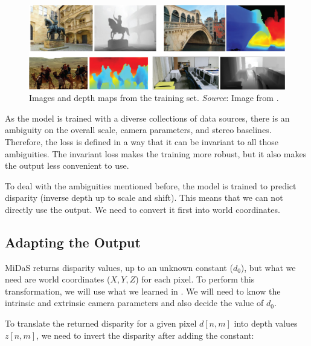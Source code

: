 \begin{figure}
\centerline{
\includegraphics[width=1\linewidth]{figures/simplesystem_revisited/examples_training_midas.jpg}
} 
\caption{Images and depth maps from the training set. {\em Source}: Image from \cite{Ranftl2022}.}
\label{fig:examples_training_midas}
\end{figure}

As the model is trained with a diverse collections of data sources, there is an ambiguity on the overall scale, camera parameters, and stereo baselines. Therefore, the loss is defined in a way that it can be invariant to all those ambiguities. The invariant loss makes the training more robust, but it also makes the output less convenient to use. 

To deal with the ambiguities mentioned before, the model is trained to predict disparity (inverse depth up to scale and shift). This means that we can not directly use the output. We need to convert it first into world coordinates. 

\subsection{Adapting the Output}\label{sec:simple_system_revisited:adapting_the_output}


MiDaS returns disparity values, up to an unknown constant ($d_0$), but what we need are world coordinates ($X,Y,Z$) for each pixel. To perform this transformation, we will use what we learned in \chap{\ref{sec:camera_parameters}}. We will need to know the intrinsic and extrinsic camera parameters and also decide the value of $d_0$.

To translate the returned disparity for a given pixel $d\left[n,m \right]$ into depth values $z\left[n,m \right]$, we need to invert the disparity after adding the constant:

